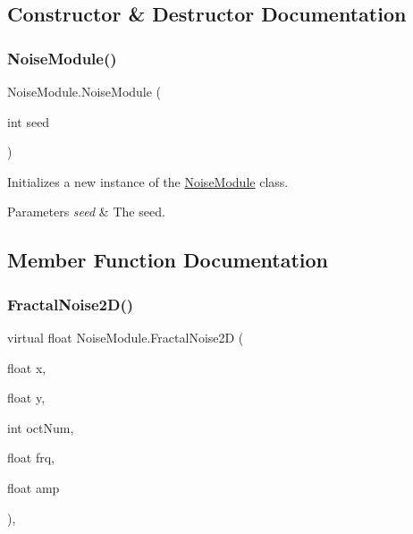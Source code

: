 \subsection{Constructor \& Destructor Documentation}
\mbox{\label{class_noise_module_a018e785221494e50a0c4c0b72e71cf33}} 
\subsubsection{\texorpdfstring{Noise\+Module()}{NoiseModule()}}
{\footnotesize\ttfamily Noise\+Module.\+Noise\+Module (\begin{DoxyParamCaption}\item[{int}]{seed }\end{DoxyParamCaption})\hspace{0.3cm}{\ttfamily [inline]}}



Initializes a new instance of the \hyperlink{class_noise_module}{Noise\+Module} class. 


\begin{DoxyParams}{Parameters}
{\em seed} & The seed.\\
\hline
\end{DoxyParams}


\subsection{Member Function Documentation}
\mbox{\label{class_noise_module_afafa2edc32e9762dd4b379bede65ad16}} 
\subsubsection{\texorpdfstring{Fractal\+Noise2\+D()}{FractalNoise2D()}}
{\footnotesize\ttfamily virtual float Noise\+Module.\+Fractal\+Noise2D (\begin{DoxyParamCaption}\item[{float}]{x,  }\item[{float}]{y,  }\item[{int}]{oct\+Num,  }\item[{float}]{frq,  }\item[{float}]{amp }\end{DoxyParamCaption})\hspace{0.3cm}{\ttfamily [inline]}, {\ttfamily [virtual]}}



